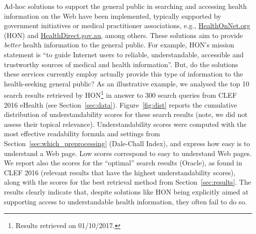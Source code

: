Ad-hoc solutions to support the general public in searching and accessing health information on the Web have been implemented, typically supported by government initiatives or medical practitioner associations, e.g., \url{HealthOnNet.org} (HON) and \url{HealthDirect.gov.au}, among others. These solutions aim to provide \textit{better} health information to the general public. For example, HON's mission statement is ``to guide Internet users to reliable, understandable, accessible and trustworthy sources of medical and health information''. But, do the solutions these services currently employ actually provide this type of information to the health-seeking general public? As an illustrative example, we analysed the top 10 search results retrieved by HON\footnote{Results retrieved on 01/10/2017.} in answer to 300 search queries from CLEF 2016 eHealth (see Section~\ref{sec:data}). Figure~\ref{fig:dist} reports the cumulative distribution of understandability scores for these search results (note, we did not assess their topical relevance). Understandability scores were computed with the most effective readability formula and settings from Section~\ref{sec:which_preprocessing} (Dale-Chall Index), and express how easy is to understand a Web page. Low scores correspond to easy to understand Web pages. We report also the scores for the ``optimal'' search results (Oracle), as found in CLEF 2016 (relevant results that have the highest understandability scores), along with the scores for the best retrieval method from Section~\ref{sec:results}. The results clearly indicate that, despite solutions like HON being explicitly aimed at supporting access to understandable health information, they often fail to do so.



